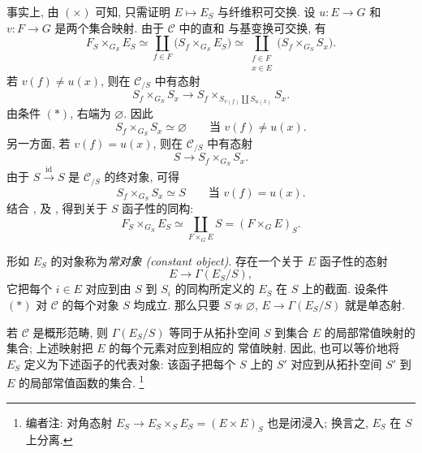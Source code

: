 事实上, 由 \((\times)\) 可知, 只需证明 \(E\mapsto E_S\) 与纤维积可交换.
设 \(u:E\to G\) 和 \(v:F\to G\) 是两个集合映射. 由于 \(\mathscr C\) 中的直和
与基变换可交换, 有
\begin{equation}
  \tag{1}\label{sga3:i:subsection:1-8:equation:1}
  F_S\mathbin{\times_{G_S}}E_S
  \simeq
  \coprod_{f\in F}
    \bigl(S_f\mathbin{\times_{G_S}}E_S\bigr)
  \simeq
  \coprod_{\substack{f\in F\\x\in E}}
    \bigl(S_f\mathbin{\times_{G_S}}S_x\bigr).
\end{equation}
若 \(v(f)\ne u(x)\), 则在 \(\mathscr C_{/S}\) 中有态射
\[
  S_f\mathbin{\times_{G_S}}S_x
  \longrightarrow
  S_f\mathbin{\times_{S_{v(f)}\coprod S_{u(x)}}}S_x.
\]
由条件 \((*)\), 右端为 \(\varnothing\). 因此
\begin{equation}
  \tag{2}\label{sga3:i:subsection:1-8:equation:2}
  S_f\mathbin{\times_{G_S}}S_x\simeq\varnothing
  \qquad\text{当 }v(f)\ne u(x).
\end{equation}
另一方面, 若 \(v(f)=u(x)\), 则在 \(\mathscr C_{/S}\) 中有态射
\[
  S\longrightarrow S_f\mathbin{\times_{G_S}}S_x.
\]
由于 \(S\xrightarrow{\operatorname{id}}S\) 是 \(\mathscr C_{/S}\) 的终对象, 可得
\begin{equation}
  \tag{3}\label{sga3:i:subsection:1-8:equation:3}
  S_f\mathbin{\times_{G_S}}S_x\simeq S
  \qquad\text{当 }v(f)=u(x).
\end{equation}
结合 , 
及 , 得到关于 \(S\) 函子性的同构:
\[
  F_S\mathbin{\times_{G_S}}E_S
  \simeq \coprod_{F\times_G E}S
  =(F\mathbin{\times_G}E)_S.
\]

形如 \(E_S\) 的对象称为\emph{常对象 (constant object)}. 存在一个关于 \(E\)
函子性的态射
\[
  E\longrightarrow\Gamma(E_S/S),
\]
它把每个 \(i\in E\) 对应到由 \(S\) 到 \(S_i\) 的同构所定义的 \(E_S\) 在
\(S\) 上的截面. 设条件 \((*)\) 对 \(\mathscr C\) 的每个对象 \(S\) 均成立.
那么只要 \(S\not\simeq\varnothing\), \(E\to\Gamma(E_S/S)\) 就是单态射.

若 \(\mathscr C\) 是概形范畴, 则 \(\Gamma(E_S/S)\) 等同于从拓扑空间 \(S\)
到集合 \(E\) 的局部常值映射的集合; 上述映射把 \(E\) 的每个元素对应到相应的
常值映射. 因此, 也可以等价地将 \(E_S\) 定义为下述函子的代表对象: 该函子把每个
\(S\) 上的 \(S'\) 对应到从拓扑空间 \(S'\) 到 \(E\) 的局部常值函数的集合.
\footnote{编者注: 对角态射 \(E_S\to E_S\times_SE_S=(E\times E)_S\) 也是闭浸入;
换言之, \(E_S\) 在 \(S\) 上分离.}

